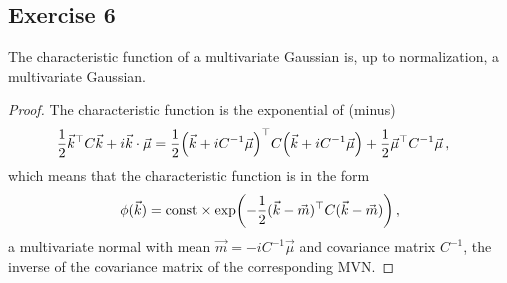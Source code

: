 \documentclass[main.tex]{subfiles}
\begin{document}
\subsection*{Exercise 6}

\begin{claim}
The characteristic function of a multivariate Gaussian is, up to normalization, a multivariate Gaussian. 
\end{claim}

\begin{proof}
The characteristic function is the exponential of (minus) 
%
\begin{align}
\frac{1}{2} \vec{k}^{\top} C \vec{k} + i \vec{k} \cdot \vec{\mu} 
&=  \frac{1}{2} \qty(\vec{k} + i C^{-1} \vec{\mu })^{\top} C 
\qty(\vec{k} + iC^{-1}\vec{\mu }) + \frac{1}{2} \vec{\mu }^{\top} C^{-1} \vec{\mu }  
\,,
\end{align}
%
which means that the characteristic function is in the form 
%
\begin{align}
\phi (\vec{k}) = \text{const} \times \exp(- \frac{1}{2} (\vec{k} -\vec{m})^{\top} C (\vec{k} - \vec{m}) )
\,,
\end{align}
%
a multivariate normal with mean \(\vec{m} = -i C^{-1} \vec{\mu}\) and covariance matrix \(C^{-1}\), the inverse of the covariance matrix of the corresponding MVN.  
\end{proof}
\end{document}
